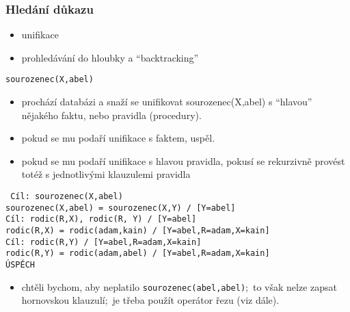 \documentclass[red,professionalfont]{beamer}
\theoremstyle{definition}
\newcommand{\0}{\mbox{${\bf 0}$}}
\begin{document}
\begin{frame}\frametitle{Hledání důkazu}
 \begin{itemize}
  \item unifikace\pause
  \item prohledávání do hloubky a ``backtracking''\pause
 \end{itemize}
\begin{block}{}
 \begin{center}
      {\tt sourozenec(X,abel)}
 \end{center}
\end{block}\pause

 \begin{itemize}
  \item prochází databázi a snaží se unifikovat sourozenec(X,abel) s ``hlavou'' nějakého faktu, nebo pravidla (procedury).\pause
  \item pokud se mu podaří unifikace s faktem, uspěl.\pause
  \item pokud se mu podaří unifikace s hlavou pravidla, pokusí se rekurzivně provést totéž s jednotlivými klauzulemi pravidla\pause
 \end{itemize}
{\tiny\tt
Cíl: sourozenec(X,abel)\pause\\
\hskip0.5cm  sourozenec(X,abel) = sourozenec(X,Y) / [Y=abel]\pause\\
\hskip1cm    Cíl: rodic(R,X), rodic(R, Y) / [Y=abel]\pause\\
\hskip1.5cm      rodic(R,X) = rodic(adam,kain) / [Y=abel,R=adam,X=kain]\pause\\
\hskip2cm        Cíl: rodic(R,Y) / [Y=abel,R=adam,X=kain]\pause\\
\hskip2.5cm           rodic(R,Y) = rodic(adam,abel) / [Y=abel,R=adam,X=kain]\pause\\
\hskip2.5cm           \alert{ÚSPĚCH}\pause\\
}
\begin{itemize}
 \item chtěli bychom, aby neplatilo {\tt sourozenec(abel,abel)};\pause\ to však nelze zapsat hornovskou klauzulí;\pause\ je třeba použít operátor řezu (viz dále).
\end{itemize}
\end{frame}
\end{document}
